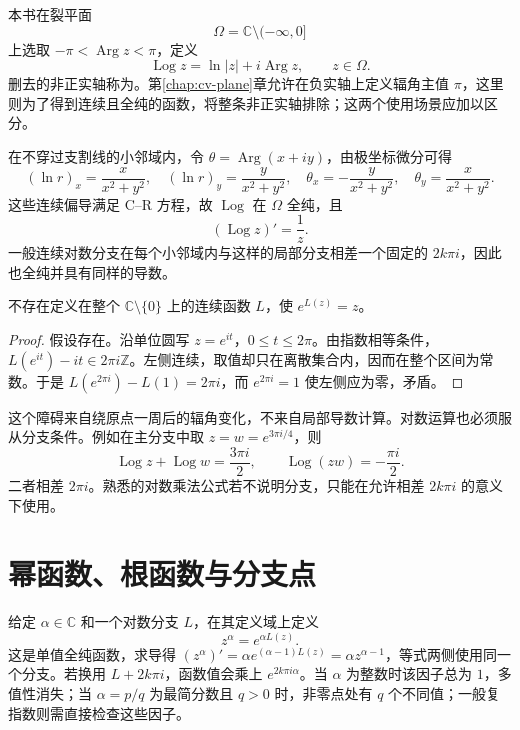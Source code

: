\documentclass[UTF8,12pt,a4paper,fontset=fandol]{ctexbook}
\begin{document}
本书在裂平面
\[
 \Omega=\mathbb C\setminus(-\infty,0]
\]
上选取 $-\pi<\operatorname{Arg}z<\pi$，定义
\begin{equation}
 \operatorname{Log}z=\ln|z|+i\operatorname{Arg}z,
 \qquad z\in\Omega.
 \label{eq:cv-log}
\end{equation}
删去的非正实轴称为。第\ref{chap:cv-plane}章允许在负实轴上定义辐角主值 $\pi$，这里则为了得到连续且全纯的函数，将整条非正实轴排除；这两个使用场景应加以区分。

在不穿过支割线的小邻域内，令 $\theta=\operatorname{Arg}(x+iy)$，由极坐标微分可得
\[
 (\ln r)_x=\frac{x}{x^2+y^2},\quad
 (\ln r)_y=\frac{y}{x^2+y^2},\quad
 \theta_x=-\frac{y}{x^2+y^2},\quad
 \theta_y=\frac{x}{x^2+y^2}.
\]
这些连续偏导满足 C--R 方程，故 $\operatorname{Log}$ 在 $\Omega$ 全纯，且
\begin{equation}
 (\operatorname{Log}z)'=\frac1z.
 \label{eq:cv-log-derivative}
\end{equation}
一般连续对数分支在每个小邻域内与这样的局部分支相差一个固定的 $2k\pi i$，因此也全纯并具有同样的导数。

\begin{proposition}[去心平面上不存在连续对数分支]
\label{prop:cv-no-global-log}
不存在定义在整个 $\mathbb C\setminus\{0\}$ 上的连续函数 $L$，使 $e^{L(z)}=z$。
\end{proposition}
\begin{proof}
假设存在。沿单位圆写 $z=e^{it}$，$0\le t\le2\pi$。由指数相等条件，$L(e^{it})-it\in2\pi i\mathbb Z$。左侧连续，取值却只在离散集合内，因而在整个区间为常数。于是 $L(e^{2\pi i})-L(1)=2\pi i$，而 $e^{2\pi i}=1$ 使左侧应为零，矛盾。
\end{proof}

这个障碍来自绕原点一周后的辐角变化，不来自局部导数计算。对数运算也必须服从分支条件。例如在主分支中取 $z=w=e^{3\pi i/4}$，则
\[
 \operatorname{Log}z+\operatorname{Log}w=\frac{3\pi i}{2},\qquad
 \operatorname{Log}(zw)=-\frac{\pi i}{2}.
\]
二者相差 $2\pi i$。熟悉的对数乘法公式若不说明分支，只能在允许相差 $2k\pi i$ 的意义下使用。

\section{幂函数、根函数与分支点}

给定 $\alpha\in\mathbb C$ 和一个对数分支 $L$，在其定义域上定义
\[
 z^\alpha=e^{\alpha L(z)}.
\]
这是单值全纯函数，求导得 $(z^\alpha)'=\alpha e^{(\alpha-1)L(z)}=\alpha z^{\alpha-1}$，等式两侧使用同一个分支。若换用 $L+2k\pi i$，函数值会乘上 $e^{2k\pi i\alpha}$。当 $\alpha$ 为整数时该因子总为 $1$，多值性消失；当 $\alpha=p/q$ 为最简分数且 $q>0$ 时，非零点处有 $q$ 个不同值；一般复指数则需直接检查这些因子。
\end{document}
